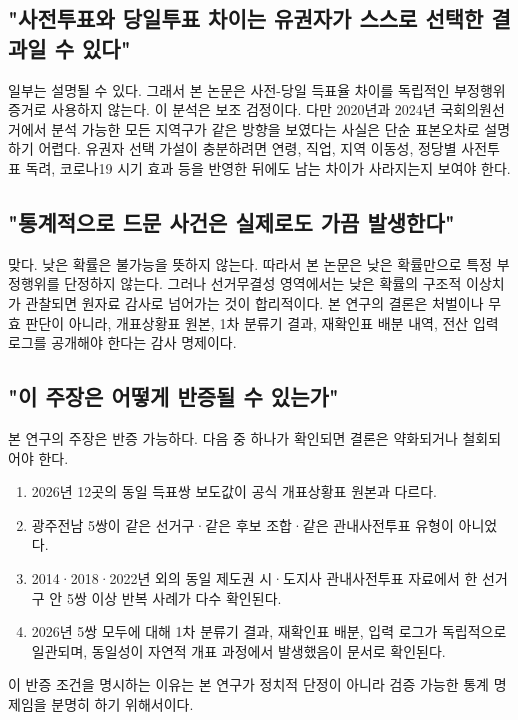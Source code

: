 \documentclass[preprint]{IEIE}
\begin{document}
\subsection{"사전투표와 당일투표 차이는 유권자가 스스로 선택한 결과일 수 있다"}

일부는 설명될 수 있다. 그래서 본 논문은 사전-당일 득표율 차이를 독립적인 부정행위 증거로 사용하지 않는다. 이 분석은 보조 검정이다. 다만 2020년과 2024년 국회의원선거에서 분석 가능한 모든 지역구가 같은 방향을 보였다는 사실은 단순 표본오차로 설명하기 어렵다. 유권자 선택 가설이 충분하려면 연령, 직업, 지역 이동성, 정당별 사전투표 독려, 코로나19 시기 효과 등을 반영한 뒤에도 남는 차이가 사라지는지 보여야 한다.

\subsection{"통계적으로 드문 사건은 실제로도 가끔 발생한다"}

맞다. 낮은 확률은 불가능을 뜻하지 않는다. 따라서 본 논문은 낮은 확률만으로 특정 부정행위를 단정하지 않는다. 그러나 선거무결성 영역에서는 낮은 확률의 구조적 이상치가 관찰되면 원자료 감사로 넘어가는 것이 합리적이다. 본 연구의 결론은 처벌이나 무효 판단이 아니라, 개표상황표 원본, 1차 분류기 결과, 재확인표 배분 내역, 전산 입력 로그를 공개해야 한다는 감사 명제이다.

\subsection{"이 주장은 어떻게 반증될 수 있는가"}

본 연구의 주장은 반증 가능하다. 다음 중 하나가 확인되면 결론은 약화되거나 철회되어야 한다.

\begin{enumerate}
\item 2026년 12곳의 동일 득표쌍 보도값이 공식 개표상황표 원본과 다르다.
\item 광주전남 5쌍이 같은 선거구·같은 후보 조합·같은 관내사전투표 유형이 아니었다.
\item 2014·2018·2022년 외의 동일 제도권 시·도지사 관내사전투표 자료에서 한 선거구 안 5쌍 이상 반복 사례가 다수 확인된다.
\item 2026년 5쌍 모두에 대해 1차 분류기 결과, 재확인표 배분, 입력 로그가 독립적으로 일관되며, 동일성이 자연적 개표 과정에서 발생했음이 문서로 확인된다.
\end{enumerate}

이 반증 조건을 명시하는 이유는 본 연구가 정치적 단정이 아니라 검증 가능한 통계 명제임을 분명히 하기 위해서이다.
\end{document}
